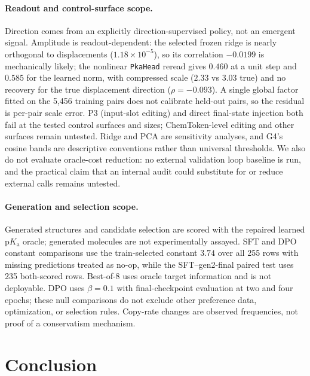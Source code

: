 \documentclass[11pt]{article}
\newcommand{\pka}{\mathrm{p}K_{\mathrm a}}
\begin{document}
\paragraph{Readout and control-surface scope.} Direction comes from an explicitly direction-supervised policy, not an emergent signal. Amplitude is readout-dependent: the selected frozen ridge is nearly orthogonal to displacements ($1.18\times10^{-5}$), so its correlation $-0.0199$ is mechanically likely; the nonlinear \texttt{PkaHead} reread gives $0.460$ at a unit step and $0.585$ for the learned norm, with compressed scale ($2.33$ vs $3.03$ true) and no recovery for the true displacement direction ($\rho=-0.093$). A single global factor fitted on the 5{,}456 training pairs does not calibrate held-out pairs, so the residual is per-pair scale error. P3 (input-slot editing) and direct final-state injection both fail at the tested control surfaces and sizes; ChemToken-level editing and other surfaces remain untested. Ridge and PCA are sensitivity analyses, and G4's cosine bands are descriptive conventions rather than universal thresholds. We also do not evaluate oracle-cost reduction: no external validation loop baseline is run, and the practical claim that an internal audit could substitute for or reduce external calls remains untested.

\paragraph{Generation and selection scope.} Generated structures and candidate selection are scored with the repaired learned $\pka$ oracle; generated molecules are not experimentally assayed. SFT and DPO constant comparisons use the train-selected constant $3.74$ over all 255 rows with missing predictions treated as no-op, while the SFT--gen2-final paired test uses 235 both-scored rows. Best-of-8 uses oracle target information and is not deployable. DPO uses $\beta=0.1$ with final-checkpoint evaluation at two and four epochs; these null comparisons do not exclude other preference data, optimization, or selection rules. Copy-rate changes are observed frequencies, not proof of a conservatism mechanism.

\section{Conclusion}
\label{sec:conclusion}
\end{document}
